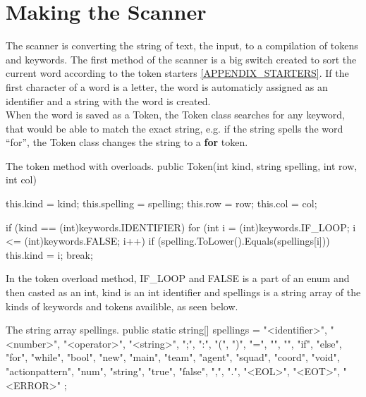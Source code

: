 \section{Making the Scanner}
The scanner is converting the string of text, the input, to a compilation of tokens and keywords. The first method of the scanner is a big switch created to sort the current word according to the token starters \ref{APPENDIX_STARTERS}. If the first character of a word is a letter, the word is automaticly assigned as an identifier and a string with the word is created.\\
When the word is saved as a Token, the Token class searches for any keyword, that would be able to match the exact string, e.g. if the string spells the word "`for"', the Token class changes the string to a \textbf{for} token.\\

\begin{source}{The token method with overloads.}{}
public Token(int kind, string spelling, int row, int col)
        {
            this.kind = kind;
            this.spelling = spelling;
            this.row = row;
            this.col = col;

            if (kind == (int)keywords.IDENTIFIER)
            {
                for (int i = (int)keywords.IF_LOOP; i <= (int)keywords.FALSE; i++)
                {
                    if (spelling.ToLower().Equals(spellings[i]))
                    {
                        this.kind = i;
                        break;
                    }
                }
            }
        }
\end{source}
In the token overload method, IF\_LOOP and FALSE is a part of an enum and then casted as an int, kind is an int identifier and spellings is a string array of the kinds of keywords and tokens availible, as seen below.

\begin{source}{The string array spellings.}{}
public static string[] spellings = 
        {
            "<identifier>", "<number>", "<operator>", "<string>", ";", ":", "(", ")", "=", "{", "}", 
            "if", "else", "for", "while", "bool", "new", "main", "team", "agent", "squad", "coord", "void", 
            "actionpattern", "num", "string", "true", "false", ",", ".", "<EOL>", "<EOT>", "<ERROR>"                         
        };
\end{source}
